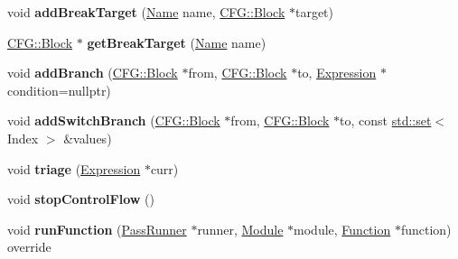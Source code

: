 \begin{DoxyCompactItemize}
\mbox{\label{structwasm_1_1_re_reloop_a51ae376438a0cabbe5484547216666b6}} 
void {\bfseries add\+Break\+Target} (\mbox{\hyperlink{structwasm_1_1_name}{Name}} name, \mbox{\hyperlink{struct_c_f_g_1_1_block}{C\+F\+G\+::\+Block}} $\ast$target)
\item 
\mbox{\label{structwasm_1_1_re_reloop_a4d3ab720002c8ed7aa7e6356062da632}} 
\mbox{\hyperlink{struct_c_f_g_1_1_block}{C\+F\+G\+::\+Block}} $\ast$ {\bfseries get\+Break\+Target} (\mbox{\hyperlink{structwasm_1_1_name}{Name}} name)
\item 
\mbox{\label{structwasm_1_1_re_reloop_a8149d17192f542763f873a4d4cbdd128}} 
void {\bfseries add\+Branch} (\mbox{\hyperlink{struct_c_f_g_1_1_block}{C\+F\+G\+::\+Block}} $\ast$from, \mbox{\hyperlink{struct_c_f_g_1_1_block}{C\+F\+G\+::\+Block}} $\ast$to, \mbox{\hyperlink{classwasm_1_1_expression}{Expression}} $\ast$condition=nullptr)
\item 
\mbox{\label{structwasm_1_1_re_reloop_a35fd84be278bc1323f6945497c3eea49}} 
void {\bfseries add\+Switch\+Branch} (\mbox{\hyperlink{struct_c_f_g_1_1_block}{C\+F\+G\+::\+Block}} $\ast$from, \mbox{\hyperlink{struct_c_f_g_1_1_block}{C\+F\+G\+::\+Block}} $\ast$to, const \mbox{\hyperlink{classstd_1_1set}{std\+::set}}$<$ Index $>$ \&values)
\item 
\mbox{\label{structwasm_1_1_re_reloop_aa99c2cb0f0c7274c68f5ab7e21e96c15}} 
void {\bfseries triage} (\mbox{\hyperlink{classwasm_1_1_expression}{Expression}} $\ast$curr)
\item 
\mbox{\label{structwasm_1_1_re_reloop_ac4502b0b5e8ae484e288c8ed86f33d89}} 
void {\bfseries stop\+Control\+Flow} ()
\item 
\mbox{\label{structwasm_1_1_re_reloop_a8848456815671eedec920335e69ac432}} 
void {\bfseries run\+Function} (\mbox{\hyperlink{structwasm_1_1_pass_runner}{Pass\+Runner}} $\ast$runner, \mbox{\hyperlink{classwasm_1_1_module}{Module}} $\ast$module, \mbox{\hyperlink{classwasm_1_1_function}{Function}} $\ast$function) override
\end{DoxyCompactItemize}
